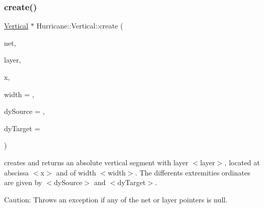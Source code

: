 \subsubsection{\texorpdfstring{create()}{create()}\hspace{0.1cm}{\footnotesize\ttfamily [1/2]}}
{\footnotesize\ttfamily \hyperlink{classHurricane_1_1Vertical}{Vertical} $\ast$ Hurricane\+::\+Vertical\+::create (\begin{DoxyParamCaption}\item[{\hyperlink{classHurricane_1_1Net}{Net} $\ast$}]{net,  }\item[{const \hyperlink{classHurricane_1_1Layer}{Layer} $\ast$}]{layer,  }\item[{const \hyperlink{group__DbUGroup_ga4fbfa3e8c89347af76c9628ea06c4146}{Db\+U\+::\+Unit} \&}]{x,  }\item[{const \hyperlink{group__DbUGroup_ga4fbfa3e8c89347af76c9628ea06c4146}{Db\+U\+::\+Unit} \&}]{width = {},  }\item[{const \hyperlink{group__DbUGroup_ga4fbfa3e8c89347af76c9628ea06c4146}{Db\+U\+::\+Unit} \&}]{dy\+Source = {},  }\item[{const \hyperlink{group__DbUGroup_ga4fbfa3e8c89347af76c9628ea06c4146}{Db\+U\+::\+Unit} \&}]{dy\+Target = {} }\end{DoxyParamCaption})\hspace{0.3cm}{\ttfamily [static]}}

creates and returns an absolute vertical segment with layer {\ttfamily $<$layer$>$}, located at abscissa {\ttfamily $<$x$>$} and of width {\ttfamily $<$width$>$}. The differents extremities ordinates are given by {\ttfamily $<$dy\+Source$>$} and {\ttfamily $<$dy\+Target$>$}.

\begin{DoxyParagraph}{Caution\+:}
Throws an exception if any of the net or layer pointers is null. 
\end{DoxyParagraph}
\mbox{\label{classHurricane_1_1Vertical_aabfa1b7d21d851f6f4c278bf2d7a2ff2}} 
